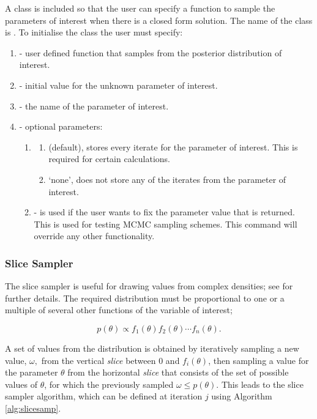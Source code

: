 \documentclass[article]{jss}
\begin{document}
A class is included so that the user can specify a function to sample
the parameters of interest when there is a closed form solution. The
name of the class is . To initialise the class the user must
specify:
\begin{enumerate}
\item {} - user defined function that samples from the posterior
  distribution of interest.
\item {} - initial value for the unknown parameter of
  interest.
\item {} - the name of the parameter of interest.
\item {} - optional parameters:

\begin{enumerate}
\item {}
  \begin{enumerate}
  \item {} (default), stores every iterate for the parameter of
    interest. This is required for certain calculations.
  \item `none', does not store any of the iterates from the parameter of interest. 
  \end{enumerate}
\item {} - is used if the user wants to fix the
  parameter value that is returned. This is used for testing MCMC
  sampling schemes.  This command will override any other
  functionality.
\end{enumerate}
\end{enumerate}

\subsubsection{Slice Sampler}

The slice sampler is useful for drawing values from complex densities;
see \citet{Radford2003} for further details. The required distribution
must be proportional to one or a multiple of several other functions
of the variable of interest;

\[p(\theta)\propto f_{1}(\theta)f_{2}(\theta)\cdots f_{n}(\theta).\]

A set of values from the distribution is obtained by iteratively sampling
a new value, $\omega,$ from the vertical \emph{slice} between 0
and $f_{i}(\theta)$, then sampling a value for the parameter $\theta$
from the horizontal \emph{slice} that consists of the set of possible
values of $\theta$, for which the previously sampled $\omega\le p(\theta)$.
This leads to the slice sampler algorithm, which can be defined at
iteration $j$ using Algorithm \ref{alg:slicesamp}.
\end{document}
